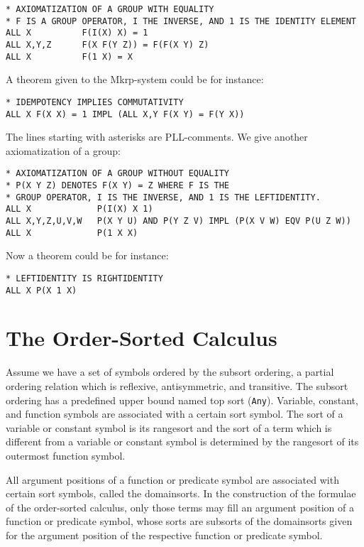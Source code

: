 \begin{verbatim}
* AXIOMATIZATION OF A GROUP WITH EQUALITY
* F IS A GROUP OPERATOR, I THE INVERSE, AND 1 IS THE IDENTITY ELEMENT 
ALL X          F(I(X) X) = 1
ALL X,Y,Z      F(X F(Y Z)) = F(F(X Y) Z)
ALL X          F(1 X) = X 
\end{verbatim}
A theorem given to the {\sc Mkrp}-system could be for instance: 

\begin{verbatim}
* IDEMPOTENCY IMPLIES COMMUTATIVITY
ALL X F(X X) = 1 IMPL (ALL X,Y F(X Y) = F(Y X))
\end{verbatim}

The lines starting with asterisks are PLL-comments. We give another 
axiomatization of a group:

\pagebreak[3]
\begin{verbatim}
* AXIOMATIZATION OF A GROUP WITHOUT EQUALITY
* P(X Y Z) DENOTES F(X Y) = Z WHERE F IS THE 
* GROUP OPERATOR, I IS THE INVERSE, AND 1 IS THE LEFTIDENTITY.
ALL X             P(I(X) X 1) 
ALL X,Y,Z,U,V,W   P(X Y U) AND P(Y Z V) IMPL (P(X V W) EQV P(U Z W))
ALL X             P(1 X X) 
\end{verbatim}

Now a theorem could be for instance:
\begin{verbatim}
* LEFTIDENTITY IS RIGHTIDENTITY
ALL X P(X 1 X)
\end{verbatim}

\section{The Order-Sorted Calculus}
\label{TheMany-SortedCalculus}

Assume we have a set of symbols ordered by the subsort ordering, a
partial ordering relation which is reflexive, antisymmetric, and
transitive. The subsort ordering has a predefined upper bound named top
sort ({\tt Any}). Variable, constant, and function symbols are
associated with a certain sort symbol.  The sort of a variable or
constant symbol is its rangesort and the sort of a term which is
different from a variable or constant symbol is determined by the
rangesort of its outermost function symbol.

All argument positions of a function or predicate symbol are
associated with certain sort symbols, called the domainsorts. In the
construction of the formulae of the order-sorted calculus, only those
terms may fill an argument position of a function or predicate symbol,
whose sorts are subsorts of the domainsorts given for the argument
position of the respective function or predicate symbol.

